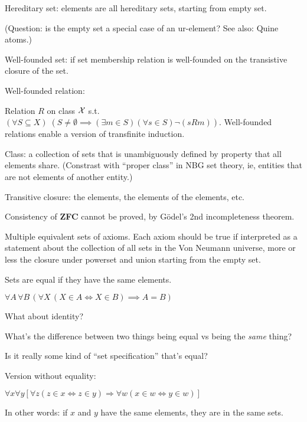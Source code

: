Hereditary set: elements are all hereditary sets, 
starting from empty set\cite{wiki:Hereditary-set}.

(Question: is the empty set a special case of an ur-element?
See also: Quine atoms\cite{wiki:Urelement}.)

Well-founded set: if set membership relation
is well-founded on the transistive closure of the set.

Well-founded relation\cite{wiki:Well-founded-relation}: 
 
Relation $R$ on class $\mathcal{X}$ s.t. 
$(\forall S\subseteq X)
\; \left(S\neq \emptyset \implies 
(\exists m\in S)(\forall s\in S)\lnot (sRm)\right).$
Well-founded relations enable a version of transfinite induction.

Class\cite{wiki:Class-set-theory}:
a collection of sets that is unambiguously defined
by property that all elements share. 
(Constrast with ``proper class'' 
in NBG set theory\cite{wiki:NBG-set-theory},
ie, entities that are not elements of another entity.)

Transitive closure: the elements, the elements of the elements,
etc.

Consistency of \textbf{ZFC} cannot be proved, 
by G\"{o}del's 2nd incompleteness theorem.

Multiple equivalent sets of axioms.
Each axiom should be true if interpreted as a statement about the
collection of all sets in the Von Neumann 
universe\cite{wiki:Von_Neumann_universe},
more or less the closure under powerset and union starting
from the empty set.


Sets are equal if they have the same 
elements.\cite{wiki:Axiom_of_extensionality,wiki:Extensionality}

$\forall A\,\forall B\,
(\forall X\,(X\in A\iff X\in B)
\implies A=B)$

What about identity? 

What's the difference between two things being equal vs
being the \textit{same} thing?

Is it really some kind of ``set specification'' that's equal?

Version without equality:

$\forall x
\forall y
[\forall z(z\in x\Leftrightarrow z\in y)
\Rightarrow 
\forall w(x\in w\Leftrightarrow y\in w)]$

In other words: if $x$ and $y$ have the same elements, 
they are in the same sets.

